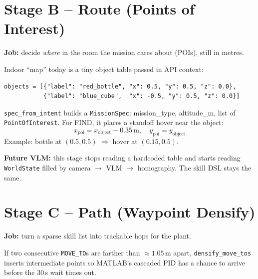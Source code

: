 \documentclass[11pt,a4paper]{article}
\begin{document}
\section{Stage B -- Route (Points of Interest)}

\textbf{Job:} decide \emph{where} in the room the mission cares about (POIs), still in metres.

Indoor ``map'' today is a tiny object table passed in API context:
\begin{verbatim}
objects = [{"label": "red_bottle", "x": 0.5, "y": 0.5, "z": 0.0},
           {"label": "blue_cube",  "x": -0.5, "y": 0.5, "z": 0.0}]
\end{verbatim}

\texttt{spec\_from\_intent} builds a \texttt{MissionSpec}: mission\_type, altitude\_m, list of
\texttt{PointOfInterest}. For FIND, it places a standoff hover near the object:
\[
x_{\text{poi}} = x_{\text{object}} - 0.35\,\text{m}, \quad y_{\text{poi}} = y_{\text{object}}
\]
Example: bottle at $(0.5,0.5)$ $\Rightarrow$ hover at $(0.15,0.5)$.

\begin{quotebox}
\textbf{Future VLM:} this stage stops reading a hardcoded table and starts reading
\texttt{WorldState} filled by camera $\to$ VLM $\to$ homography. The skill DSL stays the same.
\end{quotebox}

\section{Stage C -- Path (Waypoint Densify)}

\textbf{Job:} turn a sparse skill list into trackable hops for the plant.

If two consecutive \texttt{MOVE\_TO}s are farther than $\approx 1.05$\,m apart,
\texttt{densify\_move\_tos} inserts intermediate points so MATLAB's cascaded PID has a chance
to arrive before the 30\,s wait times out.

\begin{center}
\end{center}
\end{document}

